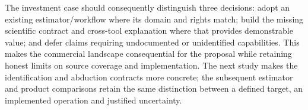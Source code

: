 The investment case should consequently distinguish three decisions: adopt
an existing estimator/workflow where its domain and rights match; build the
missing scientific contract and cross-tool explanation where that provides
demonstrable value; and defer claims requiring undocumented or unidentified
capabilities. This makes the commercial landscape consequential for the
proposal while retaining honest limits on source coverage and implementation.
The next study makes the identification and abduction contracts more concrete;
the subsequent estimator and product comparisons retain the same distinction
between a defined target, an implemented operation and justified uncertainty.
\label{exec13:commercial-identification-end}
